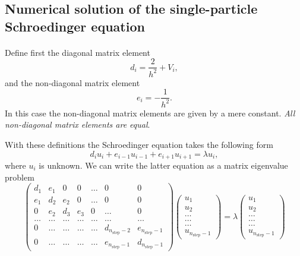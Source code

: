 \documentclass[%
twoside,                 %
final,                   %
10pt]{article}
\begin{document}
\subsection*{Numerical solution of the single-particle Schroedinger equation}

\paragraph{}
Define first the diagonal matrix element
\[
   d_i=\frac{2}{h^2}+V_i,
\]
and the non-diagonal matrix element 
\[
   e_i=-\frac{1}{h^2}.
\]
In this case the non-diagonal matrix elements are given by a mere constant. \emph{All non-diagonal matrix elements are equal}.

With these definitions the Schroedinger equation takes the following form
\[
d_iu_i+e_{i-1}u_{i-1}+e_{i+1}u_{i+1}  = \lambda u_i,
\]
where $u_i$ is unknown. We can write the 
latter equation as a matrix eigenvalue problem 
\begin{equation}
    \left( \begin{array}{ccccccc} d_1 & e_1 & 0   & 0    & \dots  &0     & 0 \\
                                e_1 & d_2 & e_2 & 0    & \dots  &0     &0 \\
                                0   & e_2 & d_3 & e_3  &0       &\dots & 0\\
                                \dots  & \dots & \dots & \dots  &\dots      &\dots & \dots\\
                                0   & \dots & \dots & \dots  &\dots       &d_{n_{\mathrm{step}}-2} & e_{n_{\mathrm{step}}-1}\\
                                0   & \dots & \dots & \dots  &\dots       &e_{n_{\mathrm{step}}-1} & d_{n_{\mathrm{step}}-1}

             \end{array} \right)      \left( \begin{array}{c} u_{1} \\
                                                              u_{2} \\
                                                              \dots\\ \dots\\ \dots\\
                                                              u_{n_{\mathrm{step}}-1}
             \end{array} \right)=\lambda \left( \begin{array}{c} u_{1} \\
                                                              u_{2} \\
                                                              \dots\\ \dots\\ \dots\\
                                                              u_{n_{\mathrm{step}}-1}
             \end{array} \right) 
      \label{eq:sematrix}
\end{equation} 
\end{document}
